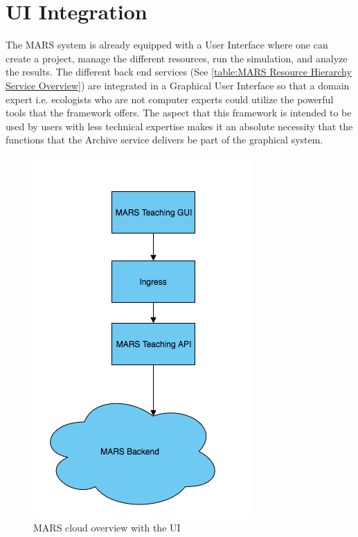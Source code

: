 \section{UI Integration}
The MARS system is already equipped with a User Interface where one can create a project, manage the different resources, run the simulation, and
analyze the results. The different back end services (See \ref{table:MARS Resource Hierarchy Service Overview}) are integrated in a Graphical
User Interface so that a domain expert i.e. ecologists who are not computer experts could utilize the powerful tools that the framework offers.
The aspect that this framework is intended to be used by users with less technical expertise makes it an absolute necessity that
the functions that the Archive service delivers be part of the graphical system.

\begin{figure}[H]
    \centering \includegraphics[scale=0.6]{grafiken/marsIngress.png}
    \caption{MARS cloud overview with the UI}
    \label{fig:marsCloudUI}
\end{figure}

